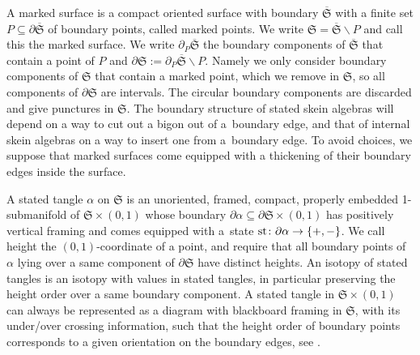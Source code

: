 \begin{Definition}
A marked surface is a compact oriented surface with boundary $\overline{\mathfrak{S}}$ with a finite set $P\subseteq \partial\overline{\mathfrak{S}}$ of boundary points, called marked points. We write $\mathfrak{S} = \overline{\mathfrak{S}} \smallsetminus P$ and call this the marked surface. We write $\partial_P\overline{\mathfrak{S}}$ the boundary components of $\overline{\mathfrak{S}}$ that contain a point of $P$ and $\partial \mathfrak{S} := \partial_P\overline{\mathfrak{S}} \smallsetminus P$. Namely we only consider boundary components of $\mathfrak{S}$ that contain a marked point, which we remove in $\mathfrak{S}$, so all components of $\partial \mathfrak{S}$ are intervals. The circular boundary components are discarded and give punctures in $\mathfrak{S}$. The boundary structure of stated skein algebras will depend on a way to cut out a bigon out of a~boundary edge, and that of internal skein algebras on a way to insert one from a~boundary edge. To avoid choices, we suppose that marked surfaces come equipped with a thickening of their boundary edges inside the surface.

A stated tangle $\alpha$ on $\mathfrak{S}$ is an unoriented, framed, compact, properly embedded 1-submanifold of $\mathfrak{S} \times (0,1)$ whose boundary $\partial \alpha \subseteq \partial\mathfrak{S} \times (0,1)$ has positively vertical framing and comes equipped with a~state ${\rm st}\colon \partial \alpha \to \{+,-\}$. We call height the $(0,1)$-coordinate of a point, and require that all boundary points of $\alpha$ lying over a same component of $\partial\mathfrak{S}$ have distinct heights. An isotopy of stated tangles is an isotopy with values in stated tangles, in particular preserving the height order over a same boundary component. A stated tangle in $\mathfrak{S} \times (0,1)$ can always be represented as a diagram with blackboard framing in $\mathfrak{S}$, with its under/over crossing information, such that the height order of boundary points corresponds to a given orientation on the boundary edges, see \cite[Section~3.5]{BonahonWong}.
\end{Definition}

